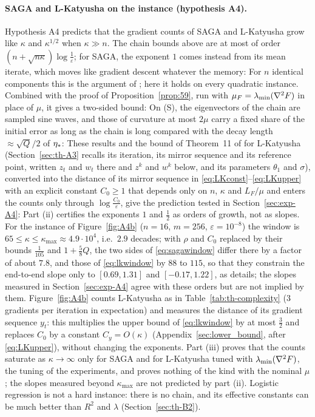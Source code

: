 \paragraph{SAGA and L-Katyusha on the instance (hypothesis A4).}
Hypothesis A4 predicts that the gradient counts of SAGA and L-Katyusha grow like $\kappa$ and $\kappa^{1/2}$ when
$\kappa\gg n$. The chain bounds above are at most of order $(n+\sqrt{n\kappa})\log\frac1\varepsilon$; for SAGA,
the exponent $1$ comes instead from its mean iterate, which moves like gradient descent whatever the memory:
For $n$ identical components this is the argument of ; here it holds on every quadratic instance.
Combined with the proof of Proposition~\ref{prop:59}, run with $\mu_F=\lambda_{\min}(\nabla^2F)$ in place of $\mu$, it gives a
two-sided bound:
On (S), the eigenvectors of the chain are sampled sine waves, and those of curvature at most $2\mu$ carry a fixed share of
the initial error as long as the chain is long compared with the decay length $\approx\sqrt Q/2$ of $\eta_\ast$:
These results and the bound of Theorem~11 of \cite{kovalev2020dont} for L-Katyusha (Section~\ref{sec:th-A3} recalls
its iteration, its mirror sequence and its reference point, written $z_t$ and $w_t$ there and $z^k$ and $w^k$ below, and
its parameters $\theta_1$ and $\sigma$), converted into the distance of its mirror sequence in
\eqref{eq:LKconst}--\eqref{eq:LKupper} with an explicit constant $C_0\ge1$ that depends only on $n$, $\kappa$ and
$L_F/\mu$ and enters the counts only through $\log\frac{C_0}\varepsilon$, give the prediction tested in
Section~\ref{sec:exp-A4}:
Part (ii) certifies the exponents $1$ and $\frac12$ as orders of growth, not as slopes. For the instance of
Figure~\ref{fig:A4b} ($n=16$, $m=256$, $\varepsilon=10^{-8}$) the window is $65\le\kappa\le\kappa_{\max}\approx4.9\cdot10^4$,
i.e.\ $2.9$ decades; with $\rho$ and $C_0$ replaced by their bounds $\frac1{105}$ and $1+\frac58Q$, the two sides of
\eqref{eq:sagawindow} differ there by a factor of about $7.8$, and those of \eqref{eq:lkwindow} by $88$ to $115$, so that
they constrain the end-to-end slope only to $[0.69,1.31]$ and $[-0.17,1.22]$, as  details; the slopes
measured in Section~\ref{sec:exp-A4} agree with these orders but are not implied by them. Figure~\ref{fig:A4b} counts
L-Katyusha as in Table~\ref{tab:th-complexity} ($3$ gradients per iteration in expectation) and measures the distance
of its gradient sequence $y_t$: this multiplies the upper bound of \eqref{eq:lkwindow} by at most $\frac32$ and
replaces $C_0$ by a constant $C_y=O(\kappa)$ (Appendix~\ref{sec:lower_bound}, after \eqref{eq:LKupper}), without
changing the exponents.
Part (iii) proves that the counts saturate as $\kappa\to\infty$ only for SAGA and for L-Katyusha tuned with
$\lambda_{\min}(\nabla^2F)$, the tuning of the experiments, and proves nothing of the kind with the nominal $\mu$; the slopes
measured beyond $\kappa_{\max}$ are not predicted by part (ii). Logistic regression is not a hard instance: there is no
chain, and its effective constants can be much better than $R^2$ and $\lambda$ (Section~\ref{sec:th-B2}).

